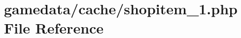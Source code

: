 \hypertarget{cache_2shopitem__1_8php}{\section{gamedata/cache/shopitem\+\_\+1.php File Reference}
\label{cache_2shopitem__1_8php}
}

